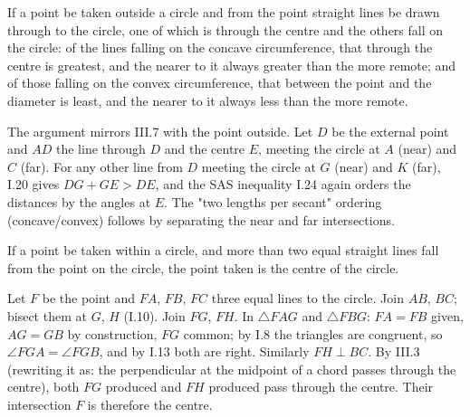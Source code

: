 \documentclass{rrxiv}
\begin{document}
\begin{claim}
\label{prop:III.8}
If a point be taken outside a circle and from the point straight
lines be drawn through to the circle, one of which is through the
centre and the others fall on the circle: of the lines falling on
the concave circumference, that through the centre is greatest, and
the nearer to it always greater than the more remote; and of those
falling on the convex circumference, that between the point and the
diameter is least, and the nearer to it always less than the more
remote.
\end{claim}
\begin{evidence}
\label{ev:III.8}
The argument mirrors III.7 with the point outside.  Let $D$ be the
external point and $AD$ the line through $D$ and the centre $E$,
meeting the circle at $A$ (near) and $C$ (far).  For any other line
from $D$ meeting the circle at $G$ (near) and $K$ (far), I.20 gives
$DG + GE > DE$, and the SAS inequality I.24 again orders the
distances by the angles at $E$.  The "two lengths per secant"
ordering (concave/convex) follows by separating the near and far
intersections.
\end{evidence}

\begin{claim}
\label{prop:III.9}
If a point be taken within a circle, and more than two equal
straight lines fall from the point on the circle, the point taken is
the centre of the circle.
\end{claim}
\begin{evidence}
\label{ev:III.9}
Let $F$ be the point and $FA$, $FB$, $FC$ three equal lines to the
circle.  Join $AB$, $BC$; bisect them at $G$, $H$ (I.10).  Join
$FG$, $FH$.  In $\triangle FAG$ and $\triangle FBG$: $FA = FB$ given,
$AG = GB$ by construction, $FG$ common; by I.8 the triangles are
congruent, so $\angle FGA = \angle FGB$, and by I.13 both are right.
Similarly $FH \perp BC$.  By III.3 (rewriting it as: the
perpendicular at the midpoint of a chord passes through the centre),
both $FG$ produced and $FH$ produced pass through the centre.  Their
intersection $F$ is therefore the centre.
\end{evidence}
\end{document}
